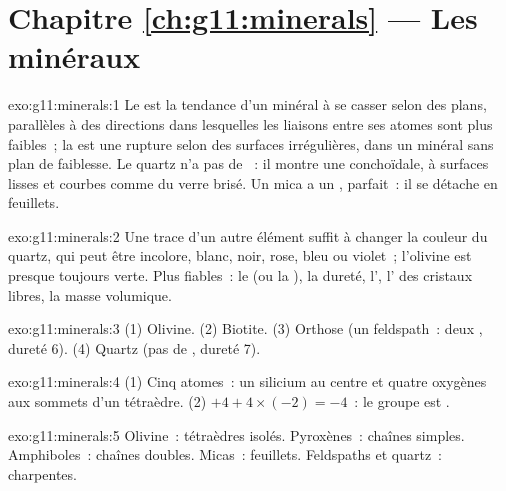 \section*{Chapitre \ref{ch:g11:minerals} --- Les minéraux}

\begin{solution}{exo:g11:minerals:1}
Le  est la tendance d'un minéral à se casser selon des plans,
parallèles à des directions dans lesquelles les liaisons entre ses atomes
sont plus faibles~; la  est une rupture selon des surfaces
irrégulières, dans un minéral sans plan de faiblesse. Le quartz n'a pas de
~: il montre une  conchoïdale, à surfaces lisses et courbes
comme du verre brisé. Un mica a un , parfait~: il se détache en
feuillets.
\end{solution}

\begin{solution}{exo:g11:minerals:2}
Une trace d'un autre élément suffit à changer la couleur du quartz, qui peut
être incolore, blanc, noir, rose, bleu ou violet~; l'olivine est presque
toujours verte. Plus fiables~: le  (ou la ), la dureté,
l', l' des cristaux libres, la masse volumique.
\end{solution}

\begin{solution}{exo:g11:minerals:3}
(1) Olivine. (2) Biotite. (3) Orthose (un feldspath~: deux , dureté
6). (4) Quartz (pas de , dureté 7).
\end{solution}

\begin{solution}{exo:g11:minerals:4}
(1) Cinq atomes~: un silicium au centre et quatre oxygènes aux sommets d'un
tétraèdre. (2) $+4 + 4 \times (-2) = -4$~: le groupe est .
\end{solution}

\begin{solution}{exo:g11:minerals:5}
Olivine~: tétraèdres isolés. Pyroxènes~: chaînes simples. Amphiboles~:
chaînes doubles. Micas~: feuillets. Feldspaths et quartz~: charpentes.
\end{solution}

